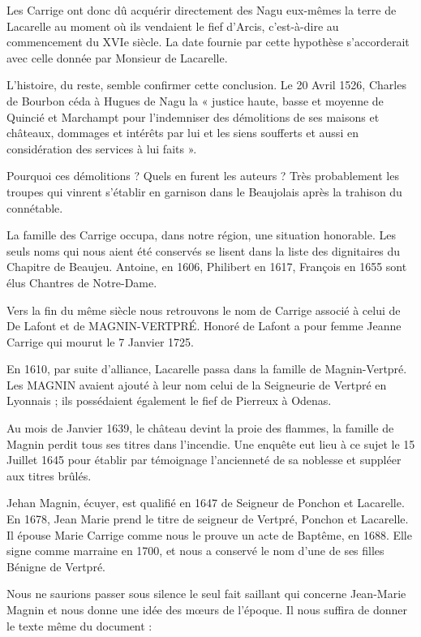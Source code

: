 Les Carrige ont donc dû acquérir directement des Nagu eux-mêmes la terre de Lacarelle au moment où ils vendaient le fief d'Arcis, c'est-à-dire au commencement du XVIe siècle. La date fournie par cette hypothèse s'accorderait avec celle donnée par Monsieur de Lacarelle.

L'histoire, du reste, semble confirmer cette conclusion. Le 20 Avril 1526, Charles de Bourbon céda à Hugues de Nagu la « justice haute, basse et moyenne de Quincié et Marchampt pour l'indemniser des démolitions de ses maisons et châteaux, dommages et intérêts par lui et les siens soufferts et aussi en considération des services à lui faits ».

Pourquoi ces démolitions ? Quels en furent les auteurs ? Très probablement les troupes qui vinrent s'établir en garnison dans le Beaujolais après la trahison du connétable.

La famille des Carrige occupa, dans notre région, une situation honorable. Les seuls noms qui nous aient été conservés se lisent dans la liste des dignitaires du Chapitre de Beaujeu. Antoine, en 1606, Philibert en 1617, François en 1655 sont élus Chantres de Notre-Dame.

Vers la fin du même siècle nous retrouvons le nom de Carrige associé à celui de De Lafont et de MAGNIN-VERTPRÉ. Honoré de Lafont a pour femme Jeanne Carrige qui mourut le 7 Janvier 1725.

En 1610, par suite d'alliance, Lacarelle passa dans la famille de Magnin-Vertpré. Les MAGNIN avaient ajouté à leur nom celui de la Seigneurie de Vertpré en Lyonnais ; ils possédaient également le fief de Pierreux à Odenas.

Au mois de Janvier 1639, le château devint la proie des flammes, la famille de Magnin perdit tous ses titres dans l'incendie. Une enquête eut lieu à ce sujet le 15 Juillet 1645 pour établir par témoignage l'ancienneté de sa noblesse et suppléer aux titres brûlés.

Jehan Magnin, écuyer, est qualifié en 1647 de Seigneur de Ponchon et Lacarelle. En 1678, Jean Marie prend le titre de seigneur de Vertpré, Ponchon et Lacarelle. Il épouse Marie Carrige comme nous le prouve un acte de Baptême, en 1688. Elle signe comme marraine en 1700, et nous a conservé le nom d'une de ses filles Bénigne de Vertpré.

Nous ne saurions passer sous silence le seul fait saillant qui concerne Jean-Marie Magnin et nous donne une idée des mœurs de l'époque. Il nous suffira de donner le texte même du document :


